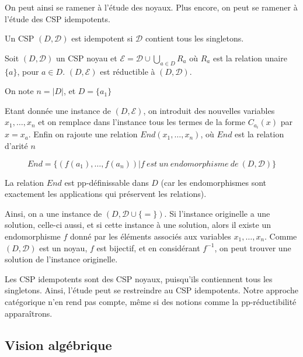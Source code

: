 On peut ainsi se ramener à l'étude des noyaux. Plus encore, on peut se ramener à l'étude des CSP idempotents.

\begin{defi}
Un CSP $(D,\mathcal{D})$ est idempotent si $\mathcal{D}$ contient tous les singletons.
\end{defi}

\begin{theo}
Soit $(D,\mathcal{D})$ un CSP noyau et $\mathcal{E} = \mathcal{D} \cup \bigcup_{a \in D} R_a$ où $R_a$ est la relation unaire $\{a\}$, pour $a \in D$. $(D,\mathcal{E})$ est réductible à $(D,\mathcal{D})$.
\end{theo}

\begin{pv}
On note $n=|D| $, et $D=\{a_1\}$

Etant donnée une instance de $(D,\mathcal{E})$, on introduit des nouvelles variables $x_1,\dots,x_n$ et on remplace dans l'instance tous les termes de la forme $C_{a_i}(x)$ par $x=x_a$. Enfin on rajoute une relation $End(x_1,\dots,x_n)$, où $End$ est la relation d'arité $n$ 

$$ End = \{(f(a_1),\dots,f(a_n))| f\ est\ un\ endomorphisme\ de\ (D,\mathcal{D})\}$$

La relation $End$ est pp-définissable dans $D$ (car les endomorphismes sont exactement les applications qui préservent les relations). 

Ainsi, on a une instance de $(D,\mathcal{D} \cup \{=\})$. Si l'instance originelle a une solution, celle-ci aussi, et si cette instance à une solution, alors il existe un endomorphisme $f$ donné par les éléments associés aux variables $x_1,\dots,x_n$. Comme $(D,\mathcal{D})$ est un noyau, $f$ est bijectif, et en considérant $f^{-1}$, on peut trouver une solution de l'instance originelle.
\end{pv}

Les CSP idempotents sont des CSP noyaux, puisqu'ils contiennent tous les singletons. Ainsi, l'étude peut se restreindre au CSP idempotents. Notre approche catégorique n'en rend pas compte, même si des notions comme la pp-réductibilité apparaîtrons.

\subsection{Vision algébrique}

